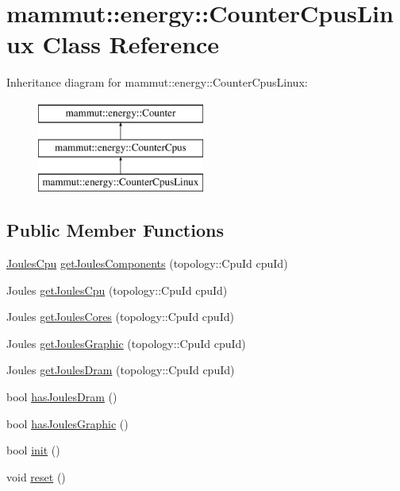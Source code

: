 \hypertarget{classmammut_1_1energy_1_1CounterCpusLinux}{\section{mammut\-:\-:energy\-:\-:Counter\-Cpus\-Linux Class Reference}
\label{classmammut_1_1energy_1_1CounterCpusLinux}
}
Inheritance diagram for mammut\-:\-:energy\-:\-:Counter\-Cpus\-Linux\-:\begin{figure}[H]
\begin{center}
\leavevmode
\includegraphics[height=3.000000cm]{classmammut_1_1energy_1_1CounterCpusLinux}
\end{center}
\end{figure}
\subsection*{Public Member Functions}
\begin{DoxyCompactItemize}
\item 
\hyperlink{classmammut_1_1energy_1_1JoulesCpu}{Joules\-Cpu} \hyperlink{classmammut_1_1energy_1_1CounterCpusLinux_a9a606911b9f9e31ef5a03225359f099f}{get\-Joules\-Components} (topology\-::\-Cpu\-Id cpu\-Id)
\item 
Joules \hyperlink{classmammut_1_1energy_1_1CounterCpusLinux_a0d02d3433187bdc382ca4f5aa14f17fe}{get\-Joules\-Cpu} (topology\-::\-Cpu\-Id cpu\-Id)
\item 
Joules \hyperlink{classmammut_1_1energy_1_1CounterCpusLinux_a72e0df170e3275d33969fa162624bfce}{get\-Joules\-Cores} (topology\-::\-Cpu\-Id cpu\-Id)
\item 
Joules \hyperlink{classmammut_1_1energy_1_1CounterCpusLinux_ad8dc0f2a9618e6d013b45090a7060042}{get\-Joules\-Graphic} (topology\-::\-Cpu\-Id cpu\-Id)
\item 
Joules \hyperlink{classmammut_1_1energy_1_1CounterCpusLinux_a444feaaad6ad295c7f70c245043fed2c}{get\-Joules\-Dram} (topology\-::\-Cpu\-Id cpu\-Id)
\item 
bool \hyperlink{classmammut_1_1energy_1_1CounterCpusLinux_a8fcb24f3bdb1a66338ff3fdbbba9ec6b}{has\-Joules\-Dram} ()
\item 
bool \hyperlink{classmammut_1_1energy_1_1CounterCpusLinux_a2390a3c17505d5e87490a6b50831c426}{has\-Joules\-Graphic} ()
\item 
bool \hyperlink{classmammut_1_1energy_1_1CounterCpusLinux_ac7169ddb9d47da49a6251b3f1c380675}{init} ()
\item 
void \hyperlink{classmammut_1_1energy_1_1CounterCpusLinux_aa1ad68623ce7571a7570398c5488a65b}{reset} ()
\end{DoxyCompactItemize}
